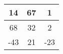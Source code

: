 \begin{table}[h]
\centering
\begin{tabular}{|c|c|c|}
\hline
14 & 67 & 1 \\ \hline
68 & 32 & 2  \\ \hline
-43 & 21  & -23  \\ \hline
\end{tabular}
\end{table}